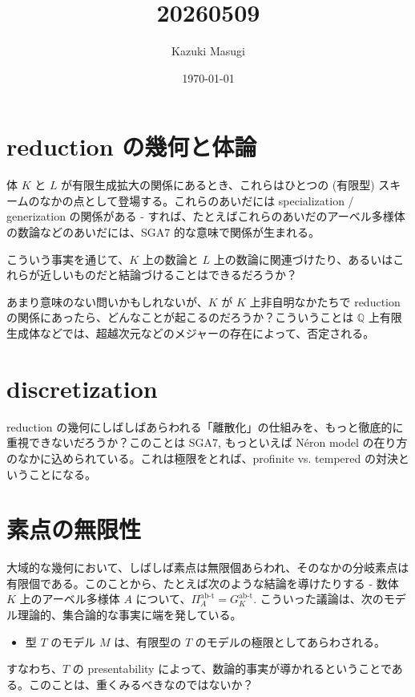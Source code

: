 \documentclass[dvipdfmx]{article}
\title{20260509}
\author{Kazuki Masugi}
\date{\today}
\theoremstyle{definition}
\begin{document}
\maketitle

\section{reduction の幾何と体論}

体 $K$ と $L$ が有限生成拡大の関係にあるとき、これらはひとつの (有限型) スキームのなかの点として登場する。これらのあいだには specialization / generization の関係がある - すれば、たとえばこれらのあいだのアーベル多様体の数論などのあいだには、SGA7 的な意味で関係が生まれる。

こういう事実を通じて、$K$ 上の数論と $L$ 上の数論に関連づけたり、あるいはこれらが近しいものだと結論づけることはできるだろうか？

あまり意味のない問いかもしれないが、$K$ が $K$ 上非自明なかたちで reduction の関係にあったら、どんなことが起こるのだろうか？こういうことは $\mathbb{Q}$ 上有限生成体などでは、超越次元などのメジャーの存在によって、否定される。 

\section{discretization}

reduction の幾何にしばしばあらわれる「離散化」の仕組みを、もっと徹底的に重視できないだろうか？このことは SGA7, もっといえば N\'eron model の在り方のなかに込められている。これは極限をとれば、profinite vs. tempered の対決ということになる。

\section{素点の無限性}

大域的な幾何において、しばしば素点は無限個あらわれ、そのなかの分岐素点は有限個である。このことから、たとえば次のような結論を導けたりする - 数体 $K$ 上のアーベル多様体 $A$ について、$\Pi_A^{\text{ab-t}} = G_K^{\text{ab-t}}$. こういった議論は、次のモデル理論的、集合論的な事実に端を発している。

\begin{itemize}
	\item 型 $T$ のモデル $M$ は、有限型の $T$ のモデルの極限としてあらわされる。
\end{itemize}

すなわち、$T$ の presentability によって、数論的事実が導かれるということである。このことは、重くみるべきなのではないか？
\end{document}
